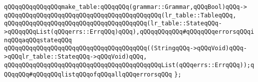 \newline
\verb|qQQqqQQqqQQqqQQqmake_table:qQQqqQQq(grammar::Grammar,qQQqBool)qQQq->|\newline
\verb|qQQqqQQqqQQqqQQqqQQqqQQqqQQqqQQqqQQqqQQqqQQq(lr_table::TableqQQq,|\newline
\verb|qQQqqQQqqQQqqQQqqQQqqQQqqQQqqQQqqQQqqQQq(lr_table::StateqQQq->qQQqqQQqList(qQQqerrs::ErrqQQq)qQQq),qQQqqQQqqQQq#qQQqqQQqerrorsqQQqinqQQqaqQQqstateqQQq|\newline
\verb|qQQqqQQqqQQqqQQqqQQqqQQqqQQqqQQqqQQqqQQq((StringqQQq->qQQqVoid)qQQq->qQQqlr_table::StateqQQq->qQQqVoid)qQQq,|\newline
\verb|qQQqqQQqqQQqqQQqqQQqqQQqqQQqqQQqqQQqqQQqqQQqList(qQQqerrs::ErrqQQq));qQQqqQQq#qQQqqQQqlistqQQqofqQQqallqQQqerrorsqQQq|\newline
\verb|};|\newline
\newline

